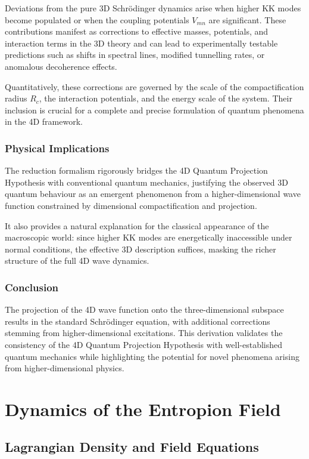 \documentclass[12pt]{article}
\begin{document}
Deviations from the pure 3D Schrödinger dynamics arise when higher KK modes become populated or when the coupling potentials \(V_{mn}\) are significant. These contributions manifest as corrections to effective masses, potentials, and interaction terms in the 3D theory and can lead to experimentally testable predictions such as shifts in spectral lines, modified tunnelling rates, or anomalous decoherence effects.

Quantitatively, these corrections are governed by the scale of the compactification radius \(R_c\), the interaction potentials, and the energy scale of the system. Their inclusion is crucial for a complete and precise formulation of quantum phenomena in the 4D framework.

\subsubsection*{Physical Implications}

The reduction formalism rigorously bridges the 4D Quantum Projection Hypothesis with conventional quantum mechanics, justifying the observed 3D quantum behaviour as an emergent phenomenon from a higher-dimensional wave function constrained by dimensional compactification and projection.

It also provides a natural explanation for the classical appearance of the macroscopic world: since higher KK modes are energetically inaccessible under normal conditions, the effective 3D description suffices, masking the richer structure of the full 4D wave dynamics.

\subsubsection*{Conclusion}

The projection of the 4D wave function onto the three-dimensional subspace results in the standard Schrödinger equation, with additional corrections stemming from higher-dimensional excitations. This derivation validates the consistency of the 4D Quantum Projection Hypothesis with well-established quantum mechanics while highlighting the potential for novel phenomena arising from higher-dimensional physics.


\section{Dynamics of the Entropion Field}

\subsection{Lagrangian Density and Field Equations}
\end{document}
